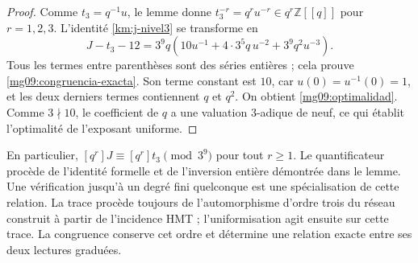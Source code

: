 \begin{proof}
Comme \(t_3=q^{-1}u\), le lemme donne
\(t_3^{-r}=q^ru^{-r}\in q^r\mathbb Z[[q]]\) pour
\(r=1,2,3\). L'identité \eqref{km:j-nivel3} se transforme en
\begin{equation}
 J-t_3-12
 =3^9q\left(10u^{-1}+4\cdot3^5q\,u^{-2}
                         +3^9q^2u^{-3}\right).
 \label{mg09:factorizacion}
\end{equation}
Tous les termes entre parenthèses sont des séries entières ; cela prouve
\eqref{mg09:congruencia-exacta}. Son terme constant est \(10\),
car \(u(0)=u^{-1}(0)=1\), et les deux derniers termes contiennent
\(q\) et \(q^2\). On obtient \eqref{mg09:optimalidad}. Comme
\(3\nmid10\), le coefficient de \(q\) a une valuation
\(3\)-adique de neuf, ce qui établit l'optimalité de l'exposant uniforme.
\end{proof}

En particulier, \([q^r]J\equiv[q^r]t_3\pmod{3^9}\) pour tout
\(r\geq1\). Le quantificateur procède de l'identité formelle et de
l'inversion entière démontrée dans le lemme. Une vérification jusqu'à
un degré fini quelconque est une spécialisation de cette relation.
La trace procède toujours de l'automorphisme d'ordre trois du réseau
construit à partir de l'incidence HMT ; l'uniformisation agit ensuite
sur cette trace. La congruence conserve cet ordre et détermine une
relation exacte entre ses deux lectures graduées.
